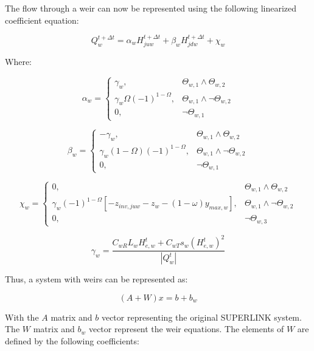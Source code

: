 \documentclass[11pt]{article}
\begin{document}
The flow through a weir can now be represented using the following linearized
coefficient equation:

\begin{equation}
  \boxed{
 Q_{w}^{t + \Delta t} = \alpha_{w} H_{juw}^{t + \Delta t} + \beta_{w} H_{jdw}^{t + \Delta t} + \chi_{w} 
 }
\end{equation}

Where:

\begin{equation}
  \boxed{
  \alpha_{w} =
  \begin{cases}
   \gamma_w, & \Theta_{w,1} \land \Theta_{w,2}\\
   \gamma_w \Omega (-1)^{1 - \Omega}, & \Theta_{w,1} \land \lnot \Theta_{w,2}\\
   0, & \lnot \Theta_{w,1}
  \end{cases}
  }
\end{equation}

\begin{equation}
  \boxed{
  \beta_{w} =
  \begin{cases}
   -\gamma_w, & \Theta_{w,1} \land \Theta_{w,2}\\
   \gamma_w (1 - \Omega) (-1)^{1 - \Omega}, & \Theta_{w,1} \land \lnot \Theta_{w,2}\\
   0, & \lnot \Theta_{w,1}
  \end{cases}
  }
\end{equation}

\begin{equation}
  \boxed{
  \chi_{w} =
  \begin{cases}
   0, & \Theta_{w,1} \land \Theta_{w,2}\\
   \gamma_w (-1)^{1 - \Omega} [- z_{inv,juw} - z_w - (1 - \omega) y_{max,w}], & \Theta_{w,1} \land \lnot \Theta_{w,2} \\
   0, & \lnot \Theta_{w,3}
  \end{cases}
  }
\end{equation}

\begin{equation}
  \boxed{
 \gamma_w = \frac{C_{wR} L_{w} H_{e,w}^t + C_{wT} s_{w} (H_{e,w}^{t})^2}{|Q_{w}^t|}
 }
\end{equation}

Thus, a system with weirs can be represented as:

\begin{equation}
  (A + W) x = b + b_w
\end{equation}

With the $A$ matrix and $b$ vector representing the original SUPERLINK system.
The $W$ matrix and $b_w$ vector represent the weir equations. The elements of
$W$ are defined by the following coefficients:
\end{document}
